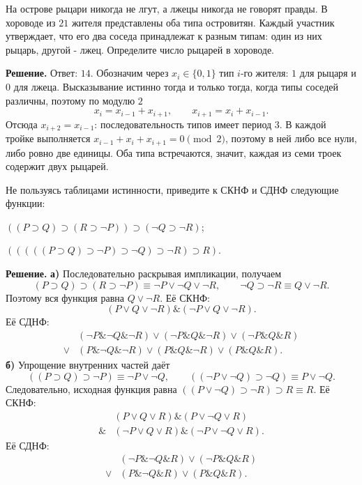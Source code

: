 \begin{problems}
\item На острове рыцари никогда не лгут, а лжецы никогда не говорят правды.
В хороводе из $21$ жителя представлены оба типа островитян.
Каждый участник утверждает, что его два соседа принадлежат к разным типам:
один из них рыцарь, другой - лжец. Определите число рыцарей в хороводе.
\par\smallskip\noindent\textbf{Решение.} Ответ: $14$. Обозначим через $x_i\in\{0,1\}$ тип $i$-го жителя: $1$ для рыцаря и $0$ для лжеца. Высказывание истинно тогда и только тогда, когда типы соседей различны, поэтому по модулю $2$
\[
x_i=x_{i-1}+x_{i+1},\qquad x_{i+1}=x_i+x_{i-1}.
\]
Отсюда $x_{i+2}=x_{i-1}$: последовательность типов имеет период $3$. В каждой тройке выполняется $x_{i-1}+x_i+x_{i+1}=0\pmod2$, поэтому в ней либо все нули, либо ровно две единицы. Оба типа встречаются, значит, каждая из семи троек содержит двух рыцарей.\par

\item Не пользуясь таблицами истинности, приведите к СКНФ и СДНФ следующие функции:
\begin{parts}
  \item $((P\supset Q)\supset(R\supset\neg P))\supset(\neg Q\supset\neg R)$;
  \item $(((((P\supset Q)\supset\neg P)\supset\neg Q)\supset\neg R)\supset R)$.
\end{parts}
\par\smallskip\noindent\textbf{Решение.} \textbf{а)} Последовательно раскрывая импликации, получаем
\[
(P\supset Q)\supset(R\supset\neg P)
\equiv\neg P\vee\neg Q\vee\neg R,
\qquad
\neg Q\supset\neg R\equiv Q\vee\neg R.
\]
Поэтому вся функция равна $Q\vee\neg R$. Её СКНФ:
\[
(P\vee Q\vee\neg R)\mathbin{\&}(\neg P\vee Q\vee\neg R).
\]
Её СДНФ:
\[
\begin{aligned}
&(\neg P\mathbin{\&}\neg Q\mathbin{\&}\neg R)
\vee(\neg P\mathbin{\&}Q\mathbin{\&}\neg R)
\vee(\neg P\mathbin{\&}Q\mathbin{\&}R)\\
{}\vee{}&(P\mathbin{\&}\neg Q\mathbin{\&}\neg R)
\vee(P\mathbin{\&}Q\mathbin{\&}\neg R)
\vee(P\mathbin{\&}Q\mathbin{\&}R).
\end{aligned}
\]
\textbf{б)} Упрощение внутренних частей даёт
\[
((P\supset Q)\supset\neg P)\equiv\neg P\vee\neg Q,
\qquad
((\neg P\vee\neg Q)\supset\neg Q)\equiv P\vee\neg Q.
\]
Следовательно, исходная функция равна $((P\vee\neg Q)\supset\neg R)\supset R\equiv R$. Её СКНФ:
\[
\begin{aligned}
&(P\vee Q\vee R)\mathbin{\&}(P\vee\neg Q\vee R)\\
{}\mathbin{\&}{}&(\neg P\vee Q\vee R)\mathbin{\&}(\neg P\vee\neg Q\vee R).
\end{aligned}
\]
Её СДНФ:
\[
\begin{aligned}
&(\neg P\mathbin{\&}\neg Q\mathbin{\&}R)
\vee(\neg P\mathbin{\&}Q\mathbin{\&}R)\\
{}\vee{}&(P\mathbin{\&}\neg Q\mathbin{\&}R)
\vee(P\mathbin{\&}Q\mathbin{\&}R).
\end{aligned}
\]\par


\end{problems}
